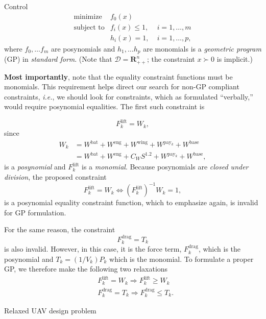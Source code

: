 \begin{chapter}{Control}
    \[
    \begin{array}{lll}
    \text{minimize} \; & f_0(x) & \\
    \text{subject to} & f_i(x) \le 1, \; & i = 1, \ldots, m \\
    & h_i(x) = 1, \; & i = 1, \ldots, p,
    \end{array}
    \]
    where $f_0, \ldots f_m$ are posynomials and $h_1, \ldots h_p$ are monomials is a \textit{geometric program} (GP)
    in \textit{standard form}. (Note that $\mathcal{D} = \mathbf{R}^n_{++}$; the constraint $x \succ 0$ is implicit.)
    
    \textbf{Most importantly}, note that the equality constraint functions must be monomials. This requirement helps direct
    our search for non-GP compliant constraints, \textit{i.e.}, we should look for constraints, which as formulated ``verbally,''
    would require posynomial equalities. The first such constraint is

    \[F_k^{\mathrm{lift}} = W_k,\]
    since 
    \[\begin{aligned}
        W_k &= W^{\mathrm{bat}} + W^{\mathrm{eng}} + W^{\mathrm{wing}} + W^{\mathrm{pay}_k} + W^{\mathrm{base}} \\
        &=W^{\mathrm{bat}} + W^{\mathrm{eng}} + C_W S^{1.2} + W^{\mathrm{pay}_k} + W^{\mathrm{base}},
    \end{aligned}\]
    is a \textit{posynomial} and $F_k^{\mathrm{lift}}$ is a \textit{monomial}. Because posynomials are
    \textit{closed under division}, the proposed constraint \[F_k^{\mathrm{lift}} = W_k \Longleftrightarrow \left(F_k^{\mathrm{lift}}\right)^{-1}W_k = 1,\]
    is a posynomial equality constraint function, which to emphasize again, is invalid for GP formulation.

    For the same reason, the constraint
    \[F_k^{\mathrm{drag}} = T_k\]
    is also invalid. However, in this case, it is the force term, $F_{k}^{\mathrm{drag}}$, which is the posynomial
    and $T_k = (1/V_k)P_k$ which is the monomial. To formulate a proper GP, we therefore make the following two relaxations
    \[\begin{aligned}
        &F_{k}^{\mathrm{lift}} = W_k \Longrightarrow F_{k}^{\mathrm{lift}} \ge W_k \\
        &F_{k}^{\mathrm{drag}} = T_k \Longrightarrow F_{k}^{\mathrm{drag}} \le T_k.
    \end{aligned}\]

    Relaxed UAV design problem


\end{chapter}
